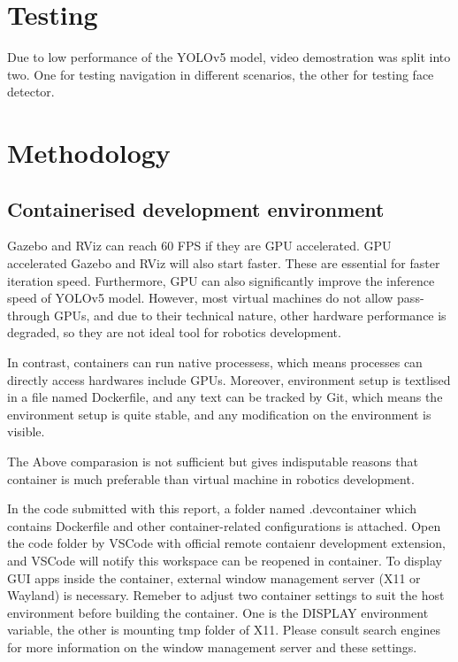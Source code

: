 \newpage
\appendix
\appendixpage
\addappheadtotoc

\setlength{\parskip}{10pt plus 4pt minus 2pt}

\section{Testing}

Due to low performance of the YOLOv5 model, video demostration was split into two. One for testing navigation in different scenarios, the other for testing face detector.


\section{Methodology}

\subsection{Containerised development environment}

Gazebo and RViz can reach 60 FPS if they are GPU accelerated. GPU accelerated Gazebo and RViz will also start faster. These are essential for faster iteration speed. Furthermore, GPU can also significantly improve the inference speed of YOLOv5 model. However, most virtual machines do not allow pass-through GPUs, and due to their technical nature, other hardware performance is degraded, so they are not ideal tool for robotics development.

In contrast, containers can run native processess, which means processes can directly access hardwares include GPUs. Moreover, environment setup is textlised in a file named Dockerfile, and any text can be tracked by Git, which means the environment setup is quite stable, and any modification on the environment is visible.

The Above comparasion is not sufficient but gives indisputable reasons that container is much preferable than virtual machine in robotics development.

In the code submitted with this report, a folder named .devcontainer which contains Dockerfile and other container-related configurations is attached. Open the code folder by VSCode with official remote contaienr development extension, and VSCode will notify this workspace can be reopened in container. To display GUI apps inside the container, external window management server (X11 or Wayland) is necessary. Remeber to adjust two container settings to suit the host environment before building the container. One is the DISPLAY environment variable, the other is mounting tmp folder of X11. Please consult search engines for more information on the window management server and these settings.


